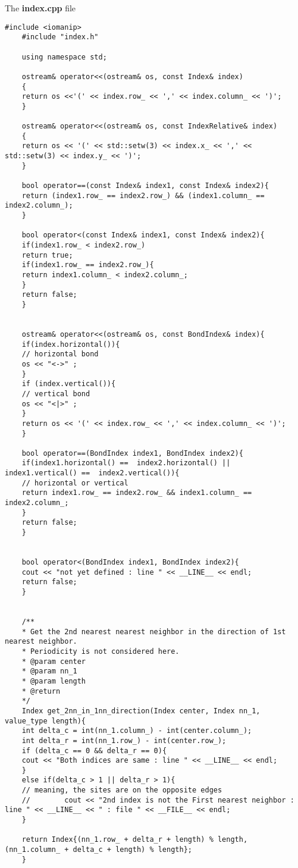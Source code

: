	
	The \textbf{index.cpp} file
	\begin{lstlisting}[style=CStyle]
	#include <iomanip>
	#include "index.h"
	
	using namespace std;
	
	ostream& operator<<(ostream& os, const Index& index)
	{
	return os <<'(' << index.row_ << ',' << index.column_ << ')';
	}
	
	ostream& operator<<(ostream& os, const IndexRelative& index)
	{
	return os << '(' << std::setw(3) << index.x_ << ',' << std::setw(3) << index.y_ << ')';
	}
	
	bool operator==(const Index& index1, const Index& index2){
	return (index1.row_ == index2.row_) && (index1.column_ == index2.column_);
	}
	
	bool operator<(const Index& index1, const Index& index2){
	if(index1.row_ < index2.row_)
	return true;
	if(index1.row_ == index2.row_){
	return index1.column_ < index2.column_;
	}
	return false;
	}
	
	
	ostream& operator<<(ostream& os, const BondIndex& index){
	if(index.horizontal()){
	// horizontal bond
	os << "<->" ;
	}
	if (index.vertical()){
	// vertical bond
	os << "<|>" ;
	}
	return os << '(' << index.row_ << ',' << index.column_ << ')';
	}
	
	bool operator==(BondIndex index1, BondIndex index2){
	if(index1.horizontal() ==  index2.horizontal() || index1.vertical() ==  index2.vertical()){
	// horizontal or vertical
	return index1.row_ == index2.row_ && index1.column_ == index2.column_;
	}
	return false;
	}
	
	
	bool operator<(BondIndex index1, BondIndex index2){
	cout << "not yet defined : line " << __LINE__ << endl;
	return false;
	}
	
	
	/**
	* Get the 2nd nearest nearest neighbor in the direction of 1st nearest neighbor.
	* Periodicity is not considered here.
	* @param center
	* @param nn_1
	* @param length
	* @return
	*/
	Index get_2nn_in_1nn_direction(Index center, Index nn_1, value_type length){
	int delta_c = int(nn_1.column_) - int(center.column_);
	int delta_r = int(nn_1.row_) - int(center.row_);
	if (delta_c == 0 && delta_r == 0){
	cout << "Both indices are same : line " << __LINE__ << endl;
	}
	else if(delta_c > 1 || delta_r > 1){
	// meaning, the sites are on the opposite edges
	//        cout << "2nd index is not the First nearest neighbor : line " << __LINE__ << " : file " << __FILE__ << endl;
	}
	
	return Index{(nn_1.row_ + delta_r + length) % length, (nn_1.column_ + delta_c + length) % length};
	}
	

\end{lstlisting}
